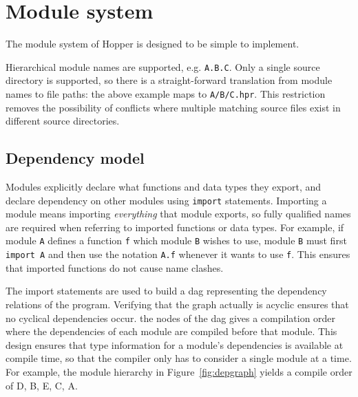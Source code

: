 \section{Module system}
\label{sec:dai_modules}


The module system of Hopper is designed to be simple to implement.

Hierarchical module names are supported, e.g. \texttt{A.B.C}. Only a single source directory is supported, so there is a straight-forward translation from module names to file paths: the above example maps to \texttt{A/B/C.hpr}. This restriction removes the possibility of conflicts where multiple matching source files exist in different source directories.

\subsection{Dependency model}
Modules explicitly declare what functions and data types they export, and declare dependency on other modules using \texttt{import} statements. Importing a module means importing \emph{everything} that module exports, so fully qualified names are required when referring to imported functions or data types. For example, if module \texttt{A} defines a function \texttt{f} which module \texttt{B} wishes to use, module \texttt{B} must first \texttt{import A} and then use the notation \texttt{A.f} whenever it wants to use \texttt{f}. This ensures that imported functions do not cause name clashes.

The import statements are used to build a \gls{dag} representing the dependency relations of the program. Verifying that the graph actually is acyclic ensures that no cyclical dependencies occur.  the nodes of the \gls{dag} gives a compilation order where the dependencies of each module are compiled before that module. This design ensures that type information for a module's dependencies is available at compile time, so that the compiler only has to consider a single module at a time. For example, the module hierarchy in Figure~\ref{fig:depgraph} yields a compile order of D, B, E, C, A.

